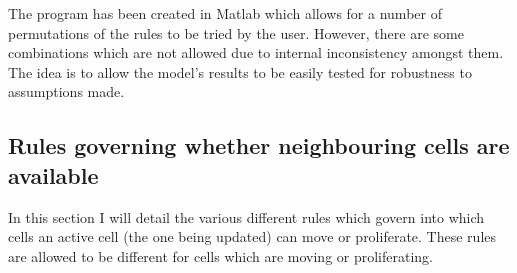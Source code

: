 \documentclass[pdftex,10pt,a4paper]{article}
\begin{document}
The program has been created in Matlab which allows for a number of permutations of the rules to be tried by the user. However, there are some combinations which are not allowed due to internal inconsistency amongst them. The idea is to allow the model's results to be easily tested for robustness to assumptions made.

\subsection{Rules governing whether neighbouring cells are available}\label{sec:rule_available}
In this section I will detail the various different rules which govern into which cells an active cell (the one being updated) can move or proliferate. These rules are allowed to be different for cells which are moving or proliferating.
\end{document}
